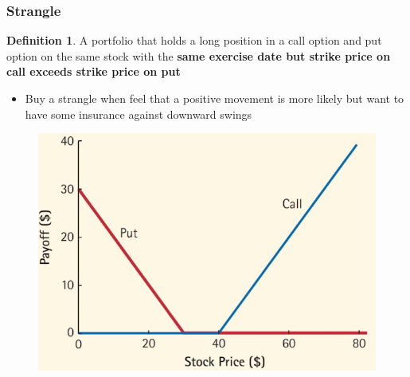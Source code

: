 \documentclass[11pt]{article}
\theoremstyle{definition}
\newtheorem*{definition}{Definition}
\begin{document}
\subsubsection{Strangle}
\begin{definition}
A portfolio that holds a long position in a call option and put option on the same stock with the \textbf{same exercise date but strike price on call exceeds strike price on put}
\begin{itemize}
    \item Buy a strangle when feel that a positive movement is more likely but want to have some insurance against downward swings
\end{itemize}
\end{definition}
\begin{figure}[h]
    \centering
    \includegraphics[scale=0.20]{Screenshot 2023-12-12 at 01.44.08.png}
\end{figure}
\end{document}
